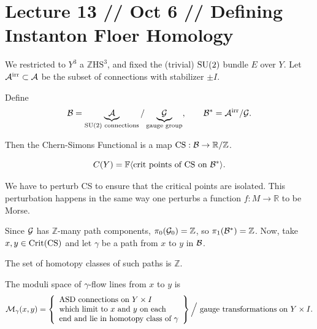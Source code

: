 \documentclass[main]{subfiles}
\begin{document}
\section*{Lecture 13 // Oct 6 // Defining Instanton Floer Homology}

\begin{recall}
We restricted to $Y^3$ a $\mathbb{Z}\mathrm{HS}^3$, and fixed the (trivial) $\operatorname{SU}(2)$ bundle $E$ over $Y$. Let $\mathcal{A}^{\mathrm{irr}}\subset \mathcal{A}$ be the subset of connections with stabilizer $\pm I$.

Define
\[
\mathcal{B} = \underbrace{\mathcal{A}}_{\operatorname{SU}(2) \text{ connections}} / \underbrace{\mathcal{G}}_{\text{gauge group}}, \qquad \mathcal{B}^\ast = \mathcal{A}^{\mathrm{irr}}/\mathcal{G}.
\]

Then the Chern-Simons Functional is a map $\operatorname{CS} : \mathcal{B}\to \mathbb{R}/\mathbb{Z}$.
\end{recall}

\begin{definition}
\[
C(Y) = \mathbb{F}\langle \text{crit points of CS on } \mathcal{B}^\ast\rangle.
\]
\end{definition}

\begin{remark}
We have to perturb CS to ensure that the critical points are isolated. This perturbation happens in the same way one perturbs a function $f: M\to \mathbb{R}$ to be Morse.
\end{remark}

Since $\mathcal{G}$ has $\mathbb{Z}$-many path components, $\pi_0(\mathcal{G}_0)=\mathbb{Z}$, so $\pi_1(\mathcal{B}^\ast)=\mathbb{Z}$. Now, take $x,y\in\operatorname{Crit}(\operatorname{CS})$ and let $\gamma$ be a path from $x$ to $y$ in $\mathcal{B}$.

The set of homotopy classes of such paths is $\mathbb{Z}$.

\begin{definition}
The moduli space of $\gamma$-flow lines from $x$ to $y$ is
\[
\mathcal{M}_\gamma(x,y) = \left\{
\begin{array}{l}
\text{ASD connections on } Y\times I \\
\text{which limit to } x \text{ and } y \text{ on each} \\
\text{end and lie in homotopy class of } \gamma
\end{array}
\right\} \Big/ \text{ gauge transformations on } Y\times I.
\]
\end{definition}
\end{document}
